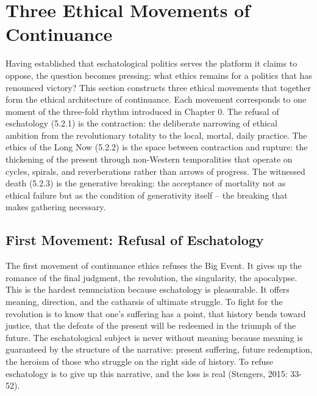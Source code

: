 \section{Three Ethical Movements of Continuance}

Having established that eschatological politics serves the platform it claims to oppose, the question becomes pressing: what ethics remains for a politics that has renounced victory? This section constructs three ethical movements that together form the ethical architecture of continuance. Each movement corresponds to one moment of the three-fold rhythm introduced in Chapter 0. The refusal of eschatology (5.2.1) is the contraction: the deliberate narrowing of ethical ambition from the revolutionary totality to the local, mortal, daily practice. The ethics of the Long Now (5.2.2) is the space between contraction and rupture: the thickening of the present through non-Western temporalities that operate on cycles, spirals, and reverberations rather than arrows of progress. The witnessed death (5.2.3) is the generative breaking: the acceptance of mortality not as ethical failure but as the condition of generativity itself -- the breaking that makes gathering necessary.

\subsection{First Movement: Refusal of Eschatology}

The first movement of continuance ethics refuses the Big Event. It gives up the romance of the final judgment, the revolution, the singularity, the apocalypse. This is the hardest renunciation because eschatology is pleasurable. It offers meaning, direction, and the catharsis of ultimate struggle. To fight for the revolution is to know that one's suffering has a point, that history bends toward justice, that the defeats of the present will be redeemed in the triumph of the future. The eschatological subject is never without meaning because meaning is guaranteed by the structure of the narrative: present suffering, future redemption, the heroism of those who struggle on the right side of history. To refuse eschatology is to give up this narrative, and the loss is real (Stengers, 2015: 33-52).

